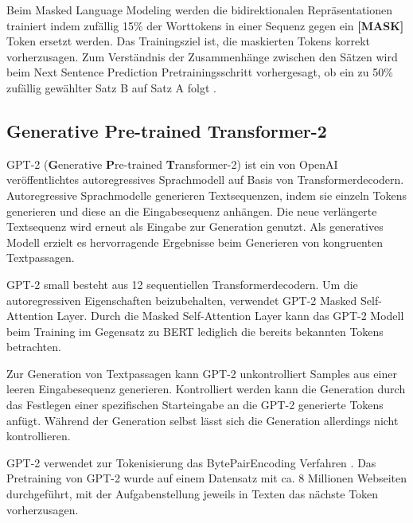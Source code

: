 Beim Masked Language Modeling werden die bidirektionalen Repräsentationen trainiert indem zufällig 15\% der Worttokens in einer Sequenz gegen ein \textbf{[MASK]} Token ersetzt werden. Das Trainingsziel ist, die maskierten Tokens korrekt vorherzusagen.
Zum Verständnis der Zusammenhänge zwischen den Sätzen wird beim Next Sentence Prediction Pretrainingsschritt vorhergesagt, ob ein zu 50\% zufällig gewählter Satz B auf Satz A folgt \citep{DBLP:journals/corr/abs-1810-04805}.

\subsection{\textbf{G}enerative \textbf{P}re-trained \textbf{T}ransformer-2}
GPT-2 (\textbf{G}enerative \textbf{P}re-trained \textbf{T}ransformer-2) ist ein von OpenAI \citep{radford2019language} veröffentlichtes autoregressives Sprachmodell auf Basis von Transformerdecodern.
Autoregressive Sprachmodelle generieren Textsequenzen, indem sie einzeln Tokens generieren und diese an die Eingabesequenz anhängen. Die neue verlängerte Textsequenz wird erneut als Eingabe zur Generation genutzt.
Als generatives Modell erzielt es hervorragende Ergebnisse beim Generieren von kongruenten Textpassagen.

GPT-2 small besteht aus 12 sequentiellen Transformerdecodern.
Um die autoregressiven Eigenschaften beizubehalten, verwendet GPT-2 Masked Self-Attention Layer. 
Durch die Masked Self-Attention Layer kann das GPT-2 Modell beim Training im Gegensatz zu BERT lediglich die bereits bekannten Tokens betrachten.

Zur Generation von Textpassagen kann GPT-2 unkontrolliert Samples aus einer leeren Eingabesequenz generieren.
Kontrolliert werden kann die Generation durch das Festlegen einer spezifischen Starteingabe an die GPT-2 generierte Tokens anfügt.
Während der Generation selbst lässt sich die Generation allerdings nicht kontrollieren.

GPT-2 verwendet zur Tokenisierung das BytePairEncoding Verfahren \citep{bytepairencoding}.
Das Pretraining von GPT-2 wurde auf einem Datensatz mit ca. 8 Millionen Webseiten durchgeführt, mit der Aufgabenstellung jeweils in Texten das nächste Token vorherzusagen.



\pagebreak
